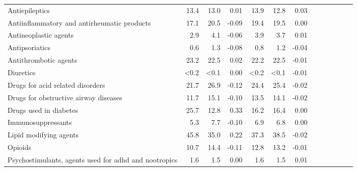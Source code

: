 \documentclass[11pt,]{article}
\begin{document}
\begin{longtable}{lrrrrrrrrrrrr}
      Antiepileptics & 13.4 & 13.0 &  0.01 & 13.9 & 12.8 &  0.03 \\ 
      Antiinflammatory and antirheumatic products & 17.1 & 20.5 & -0.09 & 19.4 & 19.5 &  0.00 \\ 
      Antineoplastic agents &  2.9 &  4.1 & -0.06 &  3.9 &  3.7 &  0.01 \\ 
      Antipsoriatics &  0.6 &  1.3 & -0.08 &  0.8 &  1.2 & -0.04 \\ 
      Antithrombotic agents & 23.2 & 22.5 &  0.02 & 22.2 & 22.5 & -0.01 \\ 
      Diuretics & <0.2 & <0.1 &  0.00 & <0.2 & <0.1 & -0.01 \\ 
      Drugs for acid related disorders & 21.7 & 26.9 & -0.12 & 24.4 & 25.4 & -0.02 \\ 
      Drugs for obstructive airway diseases & 11.7 & 15.1 & -0.10 & 13.5 & 14.1 & -0.02 \\ 
      Drugs used in diabetes & 25.7 & 12.8 &  0.33 & 16.2 & 16.4 &  0.00 \\ 
      Immunosuppressants &  5.3 &  7.7 & -0.10 &  6.9 &  6.8 &  0.00 \\ 
      Lipid modifying agents & 45.8 & 35.0 &  0.22 & 37.3 & 38.5 & -0.02 \\ 
      Opioids & 10.7 & 14.4 & -0.11 & 12.8 & 13.2 & -0.01 \\ 
      Psychostimulants, agents used for adhd and nootropics &  1.6 &  1.5 &  0.00 &  1.6 &  1.5 &  0.01 \\ 
   \bottomrule\end{longtable}
\clearpage
{}
\end{document}
